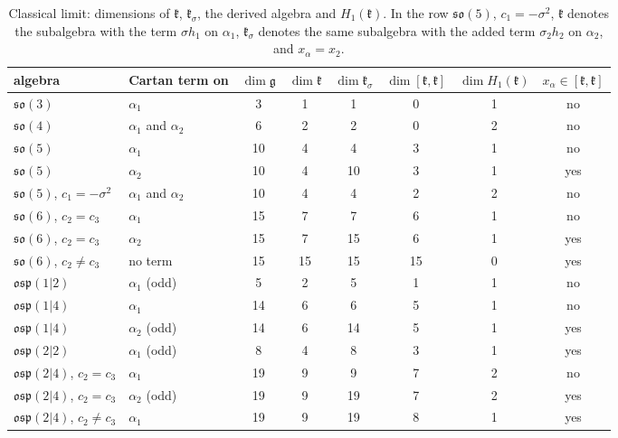 \documentclass[12pt,a4paper]{article}
\newcommand{\g}{\mathfrak{g}}
\newcommand{\kk}{\mathfrak{k}}
\newcommand{\so}{\mathfrak{so}}
\newcommand{\osp}{\mathfrak{osp}}
\begin{document}
\begin{table}[H]
\centering\small
\setlength{\tabcolsep}{4pt}
\begin{tabular}{@{}llcccccc@{}}
\toprule
algebra & Cartan term on & $\dim\g$ & $\dim\kk$ & $\dim\kk_\sigma$ & $\dim[\kk,\kk]$ & $\dim H_1(\kk)$ & $x_\alpha\in[\kk,\kk]$\\
\midrule
$\so(3)$ & $\alpha_1$ & 3 & 1 & 1 & 0 & 1 & no\\
$\so(4)$ & $\alpha_1$ and $\alpha_2$ & 6 & 2 & 2 & 0 & 2 & no\\
$\so(5)$ & $\alpha_1$ & 10 & 4 & 4 & 3 & 1 & no\\
$\so(5)$ & $\alpha_2$ & 10 & 4 & 10 & 3 & 1 & yes\\
$\so(5)$, $c_1=-\sigma^2$ & $\alpha_1$ and $\alpha_2$ & 10 & 4 & 4 & 2 & 2 & no\\
$\so(6)$, $c_2=c_3$ & $\alpha_1$ & 15 & 7 & 7 & 6 & 1 & no\\
$\so(6)$, $c_2=c_3$ & $\alpha_2$ & 15 & 7 & 15 & 6 & 1 & yes\\
$\so(6)$, $c_2\neq c_3$ & no term & 15 & 15 & 15 & 15 & 0 & yes\\
$\osp(1|2)$ & $\alpha_1$ (odd) & 5 & 2 & 5 & 1 & 1 & no\\
$\osp(1|4)$ & $\alpha_1$ & 14 & 6 & 6 & 5 & 1 & no\\
$\osp(1|4)$ & $\alpha_2$ (odd) & 14 & 6 & 14 & 5 & 1 & yes\\
$\osp(2|2)$ & $\alpha_1$ (odd) & 8 & 4 & 8 & 3 & 1 & yes\\
$\osp(2|4)$, $c_2=c_3$ & $\alpha_1$ & 19 & 9 & 9 & 7 & 2 & no\\
$\osp(2|4)$, $c_2=c_3$ & $\alpha_2$ (odd) & 19 & 9 & 19 & 7 & 2 & yes\\
$\osp(2|4)$, $c_2\neq c_3$ & $\alpha_1$ & 19 & 9 & 19 & 8 & 1 & yes\\
\bottomrule
\end{tabular}
\caption{Classical limit: dimensions of $\kk$, $\kk_\sigma$, the derived algebra and $H_1(\kk)$. In the row $\so(5)$, $c_1=-\sigma^2$, $\kk$ denotes the subalgebra with the term $\sigma h_1$ on $\alpha_1$,
$\kk_\sigma$ denotes the same subalgebra with the added term $\sigma_2h_2$ on $\alpha_2$, and $x_\alpha=x_2$.}\label{t:cl1}
\end{table}
\end{document}
